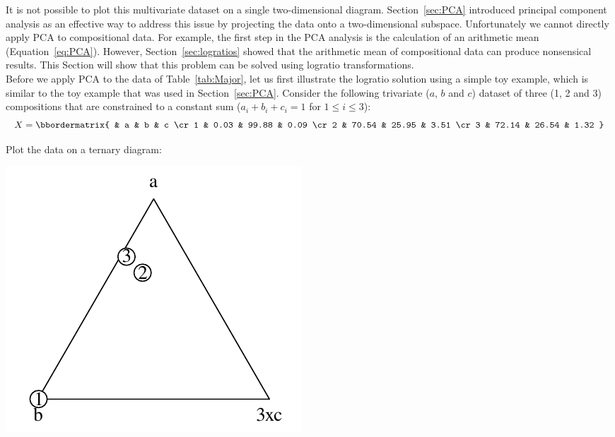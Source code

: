 It is not possible to plot this multivariate dataset on a single
two-dimensional diagram. Section~\ref{sec:PCA} introduced principal
component analysis as an effective way to address this issue by
projecting the data onto a two-dimensional subspace. Unfortunately we
cannot directly apply PCA to compositional data. For example, the
first step in the PCA analysis is the calculation of an arithmetic
mean (Equation~\ref{eq:PCA}). However, Section~\ref{sec:logratios}
showed that the arithmetic mean of compositional data can produce
nonsensical results. This Section will show that this problem can be
solved using logratio transformations.\\

Before we apply PCA to the data of Table~\ref{tab:Major}, let us first
illustrate the logratio solution using a simple toy example, which is
similar to the toy example that was used in
Section~\ref{sec:PCA}. Consider the following trivariate ($a$, $b$ and
$c$) dataset of three (1, 2 and 3) compositions that are constrained
to a constant sum ($a_i+b_i+c_i=1$ for $1\leq{i}\leq{3}$):
\begin{equation}
  X =
  \bbordermatrix{ & a & b & c \cr
   1 & 0.03 & 99.88 & 0.09 \cr
   2 & 70.54 & 25.95 & 3.51 \cr
   3 & 72.14 & 26.54 & 1.32
  }
  \label{eq:Xcomp}
\end{equation}

Plot the data on a ternary diagram:

\noindent\begin{minipage}[t][][b]{.3\textwidth}
\includegraphics[width=\textwidth]{../figures/abc.pdf}\\
\end{minipage}
\begin{minipage}[t][][t]{.7\textwidth}
  \label{fig:abc}
\end{minipage}

